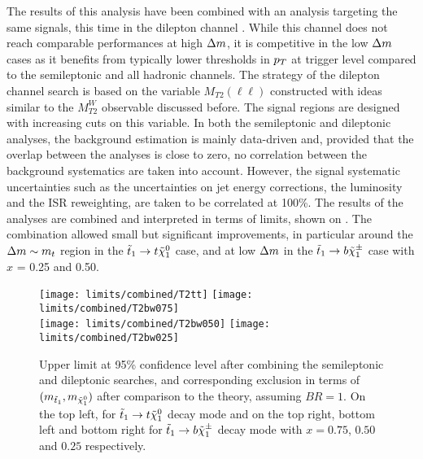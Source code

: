     The results of this analysis have been combined with an analysis targeting the same
    signals, this time in the dilepton channel \cite{stopDilepton}. While this channel does not reach
    comparable performances at high $\Delta m$, it is competitive in the low $\Delta m$ cases
    as it benefits from typically lower thresholds in $p_T$ at trigger level compared to
    the semileptonic and all hadronic
    channels. The strategy of the dilepton channel search is based on the variable $M_{T2}(\ell\ell)$ constructed
    with ideas similar to the $M_{T2}^W$ observable discussed before. The signal regions are designed
    with increasing cuts on this variable. In both the semileptonic and dileptonic analyses,
    the background estimation is mainly data-driven and, provided that the overlap between
    the analyses is close to zero, no correlation between the background systematics are
    taken into account. However, the signal systematic uncertainties such as the uncertainties
    on jet energy corrections, the luminosity and the ISR reweighting, are taken to
    be correlated at 100\%. The results of the analyses are combined and interpreted
    in terms of limits, shown on . The combination allowed
    small but significant improvements, in particular around the $\Delta m \sim m_{t}$
    region in the $\tilde{t}_1 \rightarrow t \tilde{\chi}_1^0$ case, and at low $\Delta m$ in the
    $\tilde{t}_1 \rightarrow b \tilde{\chi}_1^\pm$ case with $x$ = 0.25 and 0.50.

    \begin{figure}[h!]
        \centering
        \texttt{[image: limits/combined/T2tt]}
        \texttt{[image: limits/combined/T2bw075]}\\
        \texttt{[image: limits/combined/T2bw050]}
        \texttt{[image: limits/combined/T2bw025]}\\
        \caption{Upper limit at 95\% confidence level after combining the semileptonic
        and dileptonic searches, and corresponding exclusion in terms of $(m_{\tilde{t}_1},
        m_{\tilde{\chi}_1^0})$ after comparison to the theory, assuming
        $BR = 1$. On the top left, for $\tilde{t}_1 \rightarrow t \tilde{\chi}_1^0$ decay mode and on
        the top right, bottom left and bottom right for $\tilde{t}_1 \rightarrow b \tilde{\chi}_1^\pm$ decay
        mode with $x=0.75$, $0.50$ and $0.25$ respectively.}
        \label{fig:resultsCombined}
    \end{figure}

